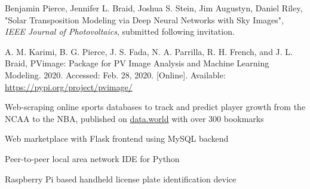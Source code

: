 \documentclass[10pt]{article}
\begin{document}
{\begin{newitemize}
{        \item{{ Benjamin Pierce}, Jennifer L. Braid, Joshua S. Stein, Jim Augustyn, Daniel Riley, "Solar Transposition Modeling via Deep Neural Networks with Sky Images", \textit{IEEE Journal of Photovoltaics}, submitted following invitation.  }
        \item{A. M. Karimi,  B. G. Pierce}, J. S. Fada, N. A. Parrilla, R. H. French, and J. L. Braid, PVimage: Package for PV Image Analysis and Machine Learning Modeling. 2020. Accessed: Feb. 28, 2020. [Online]. Available: \href{https://pypi.org/project/pvimage/}{https://pypi.org/project/pvimage/}
        
        }
        
        
	\end{newitemize}}
	
	{\begin{newitemize}
		\item{Web-scraping online sports databases to track and predict player growth from the NCAA to the NBA, published on \href{https://data.world/bgp12/nbancaacomparisons}{data.world}} with over 300 bookmarks
		\item{Web marketplace with Flask frontend using MySQL backend}
		\item{Peer-to-peer local area network IDE for Python}
		\item{Raspberry Pi based handheld license plate identification device}
		  
	\end{newitemize}}
\end{document}
